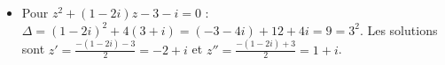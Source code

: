 \begin{corrige}
\begin{sol}
\begin{itemize}
      En consid\'eant
      $\displaystyle{
	      \begin{multiform}
		      x^2 - y^2 = 8       \\
		      x^2 + y^2 = 10      
	      \end{multiform}
      }$
      on a $ 2 x^2 = 18 $ ce qui donne $x = \pm 3$.
      Si $x = 3$, on a $2 \cdot 3 \cdot y = -6$ ce qui donne $y = -1$.
      Ainsi, $\delta = 3 - i$ v\'erifie $\delta^2 = \Delta$.
      Les racines sont donc 
      \[
      z' = \frac{(1+3i) - (3-i)}{2} = -1 + 2i
      \qquad
      \text{ et }
      \qquad
      z'' = \frac{(1+3i) + (3-i)}{2} = 2 + i
      \; .
      \]
      L'ensemble des solutions est 
      .
\item Pour $z^2 + (1-2i) z - 3 - i = 0$ : $\Delta = (1-2i)^2 + 4(3+i) = (-3-4i) + 12 + 4i = 9 = 3^2$.
      Les solutions sont $z' = \frac{-(1-2i) - 3}{2} = -2 + i$ et $z'' = \frac{-(1-2i) + 3}{2} = 1 + i$.
\end{itemize}
\end{sol}


\end{corrige}
